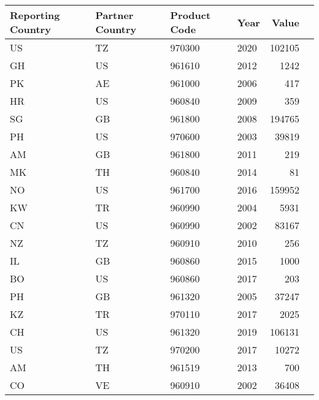 \begin{tabular}{llllrr}
\toprule
Reporting Country & Partner Country & Product Code & Year & Value \\
\midrule
 US & TZ & 970300 & 2020 & 102105 \\
 GH & US & 961610 & 2012 & 1242 \\
 PK & AE & 961000 & 2006 & 417 \\
 HR & US & 960840 & 2009 & 359 \\
 SG & GB & 961800 & 2008 & 194765 \\
 PH & US & 970600 & 2003 & 39819 \\
 AM & GB & 961800 & 2011 & 219 \\
 MK & TH & 960840 & 2014 & 81 \\
 NO & US & 961700 & 2016 & 159952 \\
 KW & TR & 960990 & 2004 & 5931 \\
 CN & US & 960990 & 2002 & 83167 \\
 NZ & TZ & 960910 & 2010 & 256 \\
 IL & GB & 960860 & 2015 & 1000 \\
 BO & US & 960860 & 2017 & 203 \\
 PH & GB & 961320 & 2005 & 37247 \\
 KZ & TR & 970110 & 2017 & 2025 \\
 CH & US & 961320 & 2019 & 106131 \\
 US & TZ & 970200 & 2017 & 10272 \\
 AM & TH & 961519 & 2013 & 700 \\
 CO & VE & 960910 & 2002 & 36408 \\
\bottomrule
\end{tabular}


